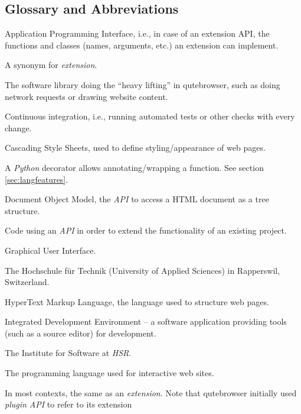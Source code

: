 
\begin{appendices}
\chapter{Glossary and Abbreviations}
\begin{multicols}{2}
\label{ch:glossary}
\begin{description}[leftmargin=0pt]
  \item[API]{Application Programming Interface, i.e., in
      case of an extension API, the functions and classes (names, arguments,
      etc.) an extension can implement.}
  \item[add-on]{A synonym for \emph{extension}.}
  \item[backend]{The software library doing the ``heavy lifting'' in
      qutebrowser, such as doing network requests or drawing website content.}
  \item[CI]{Continuous integration, i.e., running automated tests or other
      checks with every change.}
  \item[CSS]{Cascading Style Sheets, used to define styling/appearance of web pages.}
  \item[decorator] A \emph{Python} decorator allows annotating/wrapping a
    function. See section \ref{sec:langfeatures}.
  \item[DOM]{Document Object Model, the \emph{API} to access a HTML document as
      a tree structure.}
  \item[extension]{Code using an \emph{API} in order to extend the functionality
      of an existing project.}
  \item[GUI]{Graphical User Interface.}
  \item[HSR]{The Hochschule für Technik (University of Applied Sciences) in
      Rapperswil, Switzerland.}
  \item[HTML]{HyperText Markup Language, the language used to structure web
      pages.}
  \item[IDE]{Integrated Development Environment -- a software application
      providing tools (such as a source editor) for development.}
  \item[IFS]{The Institute for Software at \emph{HSR}.}
  \item[JavaScript]{The programming language used for interactive web sites.}
  \item[plugin]{In most contexts, the same as an \emph{extension}. Note that
      qutebrowser initially used \emph{plugin API} to refer to its extension
}
\end{description}
\end{multicols}
\end{appendices}
